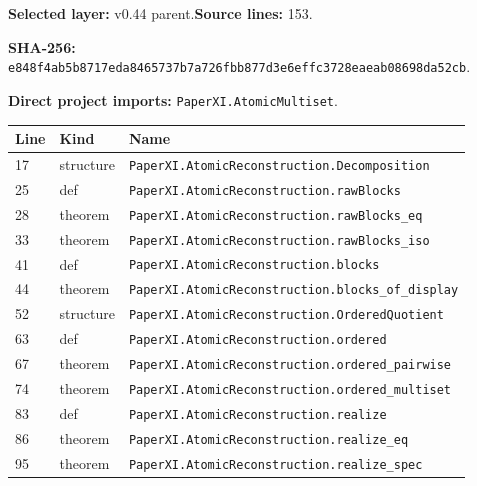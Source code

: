 \documentclass[10pt,oneside]{book}
\begin{document}
\textbf{Selected layer:} v0.44 parent.\quad\textbf{Source lines:} 153.\par\textbf{SHA-256:} {\scriptsize\nolinkurl{e848f4ab5b8717eda8465737b7a726fbb877d3e6effc3728eaeab08698da52cb}}.


\textbf{Direct project imports:} \nolinkurl{PaperXI.AtomicMultiset}.

\begin{longtable}{@{}p{}p{}p{}@{}}\toprule Line&Kind&Name\\\midrule\endhead

17&structure&\nolinkurl{PaperXI.AtomicReconstruction.Decomposition}\\

25&def&\nolinkurl{PaperXI.AtomicReconstruction.rawBlocks}\\

28&theorem&\nolinkurl{PaperXI.AtomicReconstruction.rawBlocks_eq}\\

33&theorem&\nolinkurl{PaperXI.AtomicReconstruction.rawBlocks_iso}\\

41&def&\nolinkurl{PaperXI.AtomicReconstruction.blocks}\\

44&theorem&\nolinkurl{PaperXI.AtomicReconstruction.blocks_of_display}\\

52&structure&\nolinkurl{PaperXI.AtomicReconstruction.OrderedQuotient}\\

63&def&\nolinkurl{PaperXI.AtomicReconstruction.ordered}\\

67&theorem&\nolinkurl{PaperXI.AtomicReconstruction.ordered_pairwise}\\

74&theorem&\nolinkurl{PaperXI.AtomicReconstruction.ordered_multiset}\\

83&def&\nolinkurl{PaperXI.AtomicReconstruction.realize}\\

86&theorem&\nolinkurl{PaperXI.AtomicReconstruction.realize_eq}\\

95&theorem&\nolinkurl{PaperXI.AtomicReconstruction.realize_spec}\\


\end{longtable}
\end{document}
